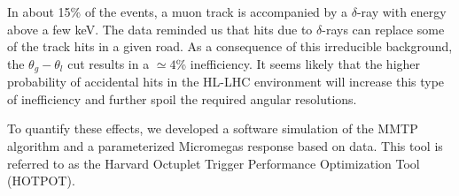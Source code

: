  In about 15\% of the events, a muon track is accompanied by a $\delta$-ray  with energy above a few keV.
 The data reminded us that hits due to $\delta$-rays  can replace some of the track hits
 in a given road. As a consequence of this irreducible background, the  $\theta_g-\theta_l$ cut results
 in a  $\simeq 4$\% inefficiency.
 It seems likely that the higher probability of accidental hits
 in the HL-LHC environment will increase this type of inefficiency and further spoil the required
 angular resolutions.

To quantify these effects, we developed a software 
 simulation of the MMTP algorithm and a parameterized Micromegas response based on data.
 This tool is referred to as the Harvard Octuplet Trigger Performance Optimization Tool (HOTPOT). 

